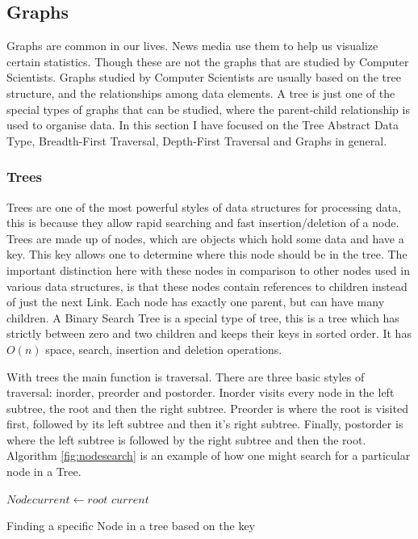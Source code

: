 \documentclass[10pt,twocolumn,hidelinks]{IEEEtran}
\begin{document}
	\subsection{Graphs}
	Graphs are common in our lives. News media use them to help us visualize certain statistics. Though these are not the graphs that are studied by Computer Scientists. Graphs studied by Computer Scientists are usually based on the tree structure, and the relationships 	among data elements. A tree is just one of the special types of graphs that can be studied, where the parent-child relationship is used to organise data. In this section I have focused on the Tree Abstract Data Type, Breadth-First Traversal, Depth-First Traversal and Graphs in general. \\
	\subsubsection{Trees}
	Trees are one of the most powerful styles of data structures for processing data, this is because they allow rapid searching and fast insertion/deletion of a node. Trees are made up of nodes, which are objects which hold some data and have a key. This key allows one to determine where this node should be in the tree. The important distinction here with these nodes in comparison to other nodes used in various data structures, is that these nodes contain references to children instead of just the next Link. Each node has exactly one parent, but can have many children. A Binary Search Tree is a special type of tree, this is a tree which has strictly between zero and two children and keeps their keys in sorted order. It has $O(n)$ space, search, insertion and deletion operations. 
	\par With trees the main function is traversal. There are three basic styles of traversal: inorder, preorder and postorder. Inorder visits every node in the left subtree, the root and then the right subtree. Preorder is where the root is visited first, followed by its left subtree and then it's right subtree. Finally, postorder is where the left subtree is followed by the right subtree and then the root. \\
Algorithm \ref{fig:nodesearch} is an example of how one might search for a particular node in a Tree.\\
\IncMargin{1em}
\begin{algorithm}
	\LinesNumbered
	$Node current \longleftarrow root$\;
\Return $current$\;
\caption{Finding a specific Node in a tree based on the key}
\label{fig:nodesearch}
\end{algorithm}\DecMargin{1em}
\end{document}
